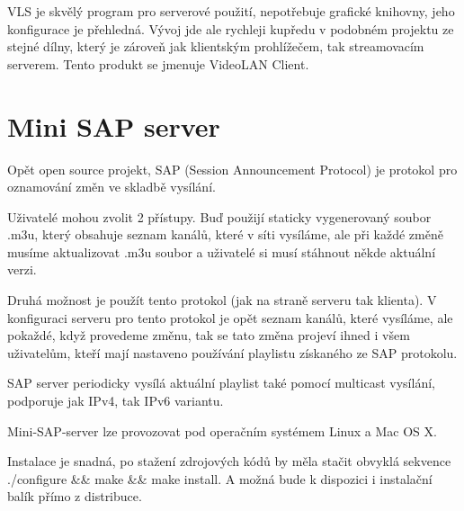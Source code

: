 \vspace{10pt}

VLS je skvělý program pro serverové použití, nepotřebuje grafické knihovny, jeho konfigurace je přehledná. Vývoj jde ale rychleji kupředu v podobném projektu ze stejné dílny, který je zároveň jak klientským prohlížečem, tak streamovacím serverem. Tento produkt se jmenuje VideoLAN Client.

\vspace{10pt}

\section{Mini SAP server}

Opět open source projekt, SAP (Session Announcement Protocol) je protokol pro oznamování změn ve skladbě vysílání. 

\vspace{10pt}

Uživatelé mohou zvolit 2 přístupy. Buď použijí staticky vygenerovaný soubor .m3u, který obsahuje seznam kanálů, které v síti vysíláme, ale při každé změně musíme aktualizovat .m3u soubor a uživatelé si musí stáhnout někde aktuální verzi.

\vspace{10pt}

Druhá možnost je použít tento protokol (jak na straně serveru tak klienta). V konfiguraci serveru pro tento protokol je opět seznam kanálů, které vysíláme, ale pokaždé, když provedeme změnu, tak se tato změna projeví ihned i všem uživatelům, kteří mají nastaveno používání playlistu získaného ze SAP protokolu.

\vspace{10pt}

SAP server periodicky vysílá aktuální playlist také pomocí multicast vysílání, podporuje jak IPv4, tak IPv6 variantu.

\vspace{10pt}

Mini-SAP-server lze provozovat pod operačním systémem Linux a Mac OS X. 

\vspace{10pt}

Instalace je snadná, po stažení zdrojových kódů by měla stačit obvyklá sekvence ./configure \&\& make \&\& make install. A možná bude k dispozici i instalační balík přímo z distribuce.

\vspace{10pt}

